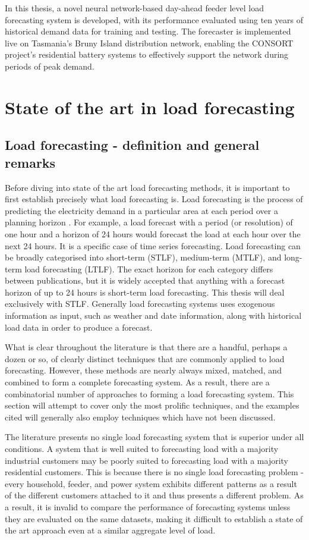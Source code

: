 In this thesis, a novel neural network-based day-ahead feeder level load forecasting system is developed, with its performance evaluated using ten years of historical demand data for training and testing. The forecaster is implemented live on Tasmania's Bruny Island distribution network, enabling the CONSORT project's residential battery systems to effectively support the network during periods of peak demand.

\section{State of the art in load forecasting}

\subsection{Load forecasting - definition and general remarks}
Before diving into state of the art load forecasting methods, it is important to first establish precisely what load forecasting is.
Load forecasting is the process of predicting the electricity demand in a particular area at each period over a planning horizon \citep{Weron2006}.
For example, a load forecast with a period (or resolution) of one hour and a horizon of 24 hours would forecast the load at each hour over the next 24 hours.
It is a specific case of time series forecasting.
Load forecasting can be broadly categorised into short-term (STLF), medium-term (MTLF), and long-term load forecasting (LTLF).
The exact horizon for each category differs between publications, but it is widely accepted that anything with a forecast horizon of up to 24 hours is short-term load forecasting.
This thesis will deal exclusively with STLF.
Generally load forecasting systems uses exogenous information as input, such as weather and date information, along with historical load data in order to produce a forecast.

What is clear throughout the literature is that there are a handful, perhaps a dozen or so, of clearly distinct techniques that are commonly applied to load forecasting.
However, these methods are nearly always mixed, matched, and combined to form a complete forecasting system.
As a result, there are a combinatorial number of approaches to forming a load forecasting system.
This section will attempt to cover only the most prolific techniques, and the examples cited will generally also employ techniques which have not been discussed.

The literature presents no single load forecasting system that is superior under all conditions.
A system that is well suited to forecasting load with a majority industrial customers may be poorly suited to forecasting load with a majority residential customers.
This is because there is no single load forecasting problem - every household, feeder, and power system exhibits different patterns as a result of the different customers attached to it and thus presents a different problem.
As a result, it is invalid to compare the performance of forecasting systems unless they are evaluated on the same datasets, making it difficult to establish a state of the art approach even at a similar aggregate level of load.

